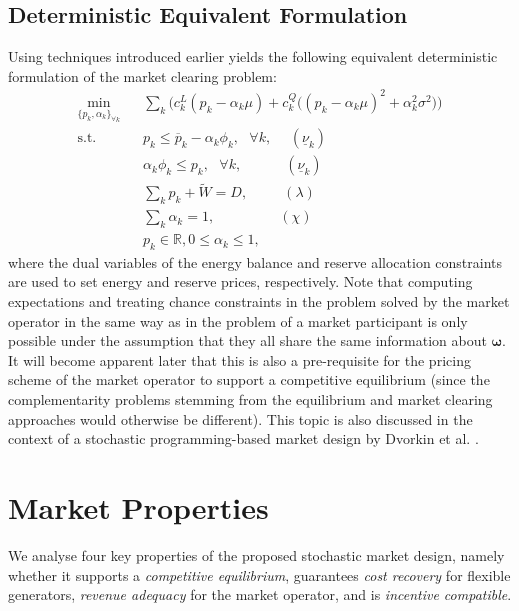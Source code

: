 \documentclass{article}
\begin{document}
\subsection{Deterministic Equivalent Formulation}
Using techniques introduced earlier yields the following equivalent deterministic formulation of the market clearing problem:
\begin{align}
\underset{\{p_k, \alpha_k\}_{\forall k}}{\min} \hspace{10pt} & \sum_k \Big(c_k^L(p_k - \alpha_k \mu) + c_k^Q \big((p_k - \alpha_k \mu)^2 + \alpha_k^2 \sigma^2\big)\Big)\\
\mbox{s.t. } & p_k \le \overline{p}_k - \alpha_k \phi_k, \mbox{ }\forall k, \hspace{15pt}(\underline{\nu}_k)\\
& \alpha_k \phi_k \le p_k, \mbox{ }\forall k, \hspace{37pt}(\underline{\nu}_k)\\
& \sum_k p_k + \tilde{W} = D, \hspace{30pt} (\lambda)\\
& \sum_k \alpha_k = 1,\hspace{55pt} (\chi) \\
& p_k \in \mathbb{R}, 0 \le \alpha_k \le 1,
\end{align}
where the dual variables of the energy balance and reserve allocation constraints are used to set energy and reserve prices, respectively. Note that computing expectations and treating chance constraints in the problem solved by the market operator in the same way as in the problem of a market participant is only possible under the assumption that they all share the same information about $\boldsymbol{\omega}$. It will become apparent later that this is also a pre-requisite for the pricing scheme of the market operator to support a competitive equilibrium (since the complementarity problems stemming from the equilibrium and market clearing approaches would otherwise be different). This topic is also discussed in the context of a stochastic programming-based market design by Dvorkin et al. \cite{DvorkinV2019}.

\section{Market Properties}

We analyse four key properties of the proposed stochastic market design, namely whether it supports a \textit{competitive equilibrium}, guarantees \textit{cost recovery} for flexible generators, \textit{revenue adequacy} for the market operator, and is \textit{incentive compatible}.
\end{document}
